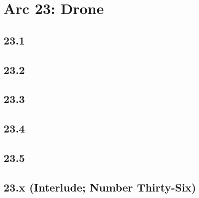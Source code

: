 \part{Arc 23: Drone}
 \chapter{23.1}
 \chapter{23.2}
 \chapter{23.3}
 \chapter{23.4}
 \chapter{23.5}
 \chapter{23.x (Interlude; Number Thirty-Six)}







